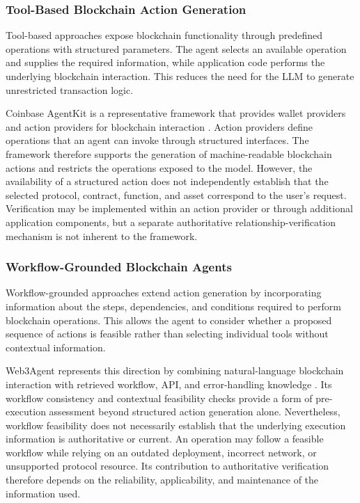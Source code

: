 \subsubsection{Tool-Based Blockchain Action Generation}

Tool-based approaches expose blockchain functionality through
predefined operations with structured parameters. The agent
selects an available operation and supplies the required
information, while application code performs the underlying
blockchain interaction. This reduces the need for the LLM
to generate unrestricted transaction logic. 

Coinbase AgentKit is a representative framework that provides
wallet providers and action providers for blockchain
interaction \cite{coinbaseAgentKit2026}. Action providers
define operations that an agent can invoke through structured
interfaces. The framework therefore supports the generation
of machine-readable blockchain actions and restricts the
operations exposed to the model. However, the availability of a structured action does not
independently establish that the selected protocol, contract,
function, and asset correspond to the user's request.
Verification may be implemented within an action provider
or through additional application components, but a
separate authoritative relationship-verification mechanism
is not inherent to the framework.

\subsubsection{Workflow-Grounded Blockchain Agents}

Workflow-grounded approaches extend action generation by
incorporating information about the steps, dependencies,
and conditions required to perform blockchain operations.
This allows the agent to consider whether a proposed
sequence of actions is feasible rather than selecting
individual tools without contextual information. 

Web3Agent represents this direction by combining
natural-language blockchain interaction with retrieved
workflow, API, and error-handling knowledge
\cite{TODO_Web3Agent}. Its workflow consistency and
contextual feasibility checks provide a form of
pre-execution assessment beyond structured action
generation alone. Nevertheless, workflow feasibility does not necessarily
establish that the underlying execution information is
authoritative or current. An operation may follow a
feasible workflow while relying on an outdated deployment,
incorrect network, or unsupported protocol resource.
Its contribution to authoritative verification therefore
depends on the reliability, applicability, and maintenance
of the information used.

